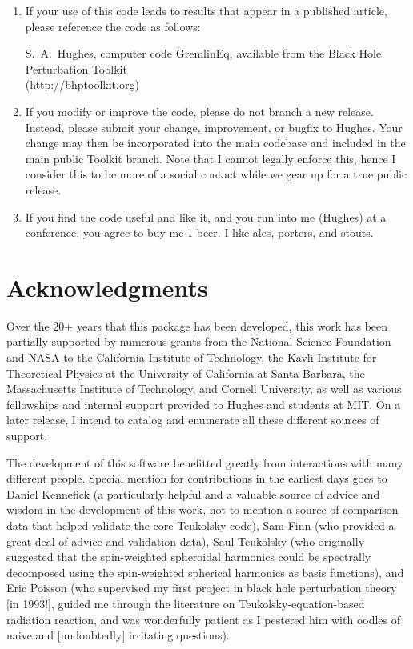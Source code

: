 \documentclass[11pt]{article}
\begin{document}
\begin{enumerate}

\item If your use of this code leads to results that appear in a published article, please reference the code as follows:

S.\ A.\ Hughes, computer code {\sc GremlinEq}, available from the Black Hole Perturbation Toolkit\\ (http://bhptoolkit.org)

\item If you modify or improve the code, please do not branch a new release.  Instead, please submit your change, improvement, or bugfix to Hughes.  Your change may then be incorporated into the main codebase and included in the main public Toolkit branch.  Note that I cannot legally enforce this, hence I consider this to be more of a social contact while we gear up for a true public release.

\item If you find the code useful and like it, and you run into me (Hughes) at a conference, you agree to buy me 1 beer.  I like ales, porters, and stouts.

\end{enumerate}

\section*{Acknowledgments}

Over the 20+ years that this package has been developed, this work has been partially supported by numerous grants from the National Science Foundation and NASA to the California Institute of Technology, the Kavli Institute for Theoretical Physics at the University of California at Santa Barbara, the Massachusetts Institute of Technology, and Cornell University, as well as various fellowships and internal support provided to Hughes and students at MIT.  On a later release, I intend to catalog and enumerate all these different sources of support.

The development of this software benefitted greatly from interactions with many different people.  Special mention for contributions in the earliest days goes to Daniel Kennefick (a particularly helpful and a valuable source of advice and wisdom in the development of this work, not to mention a source of comparison data that helped validate the core Teukolsky code), Sam Finn (who provided a great deal of advice and validation data), Saul Teukolsky (who originally suggested that the spin-weighted spheroidal harmonics could be spectrally decomposed using the spin-weighted spherical harmonics as basis functions), and Eric Poisson (who supervised my first project in black hole perturbation theory [in 1993!], guided me through the literature on Teukolsky-equation-based radiation reaction, and was wonderfully patient as I pestered him with oodles of naive and [undoubtedly] irritating questions).
\end{document}
